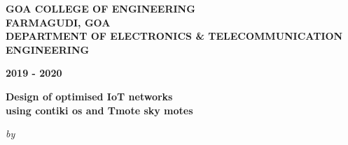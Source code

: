 \begin{center}
%
\bfseries{GOA COLLEGE OF ENGINEERING\\FARMAGUDI, GOA}\\
\bfseries{DEPARTMENT OF ELECTRONICS \& TELECOMMUNICATION ENGINEERING}\\
\begin{large}
\bfseries{2019 - 2020}\\
\end{large}
\vspace{0.5cm}
\begin{figure}[H]
{\centering {}\par}
\end{figure}
\vspace{-1.3cm}
\vspace{0.5cm}
\begin{large}
{\bfseries Design of optimised IoT networks\\using contiki os and Tmote sky motes}\\
\end{large}
\vspace{0.3cm}
\begin{small}
\emph{by}\\
\end{small}

\end{center}
